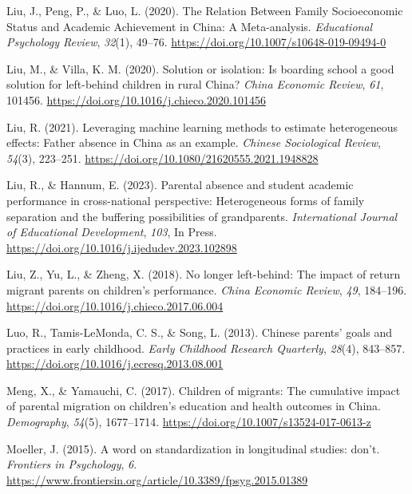 \documentclass[
  man]{apa7}
\newlength{\cslhangindent}
\newlength{\cslentryspacingunit} %
\newenvironment{CSLReferences}[2] %
 {%
  \setlength{\parindent}{0pt}
  \ifodd #1
  \let\oldpar\par
  \def\par{\hangindent=\cslhangindent\oldpar}
  \fi
  \setlength{\parskip}{#2\cslentryspacingunit}
 }%
 {}
\begin{document}
\begin{CSLReferences}{1}{0}
\leavevmode{}%
Liu, J., Peng, P., \& Luo, L. (2020). The Relation Between Family Socioeconomic Status and Academic Achievement in {China}: A Meta-analysis. \emph{Educational Psychology Review}, \emph{32}(1), 49--76. \url{https://doi.org/10.1007/s10648-019-09494-0}

\leavevmode{}%
Liu, M., \& Villa, K. M. (2020). Solution or isolation: Is boarding school a good solution for left-behind children in rural {China}? \emph{{China} Economic Review}, \emph{61}, 101456. \url{https://doi.org/10.1016/j.chieco.2020.101456}

\leavevmode{}%
Liu, R. (2021). Leveraging machine learning methods to estimate heterogeneous effects: Father absence in {China} as an example. \emph{Chinese Sociological Review}, \emph{54}(3), 223--251. \url{https://doi.org/10.1080/21620555.2021.1948828}

\leavevmode{}%
Liu, R., \& Hannum, E. (2023). Parental absence and student academic performance in cross-national perspective: Heterogeneous forms of family separation and the buffering possibilities of grandparents. \emph{International Journal of Educational Development}, \emph{103}, In Press. \url{https://doi.org/10.1016/j.ijedudev.2023.102898}

\leavevmode{}%
Liu, Z., Yu, L., \& Zheng, X. (2018). No longer left-behind: The impact of return migrant parents on children's performance. \emph{{China} Economic Review}, \emph{49}, 184--196. \url{https://doi.org/10.1016/j.chieco.2017.06.004}

\leavevmode{}%
Luo, R., Tamis-LeMonda, C. S., \& Song, L. (2013). Chinese parents{'} goals and practices in early childhood. \emph{Early Childhood Research Quarterly}, \emph{28}(4), 843--857. \url{https://doi.org/10.1016/j.ecresq.2013.08.001}

\leavevmode{}%
Meng, X., \& Yamauchi, C. (2017). Children of migrants: The cumulative impact of parental migration on children{'}s education and health outcomes in {China}. \emph{Demography}, \emph{54}(5), 1677--1714. \url{https://doi.org/10.1007/s13524-017-0613-z}

\leavevmode{}%
Moeller, J. (2015). A word on standardization in longitudinal studies: don't. \emph{Frontiers in Psychology}, \emph{6}. \url{https://www.frontiersin.org/article/10.3389/fpsyg.2015.01389}


\end{CSLReferences}
\end{document}
